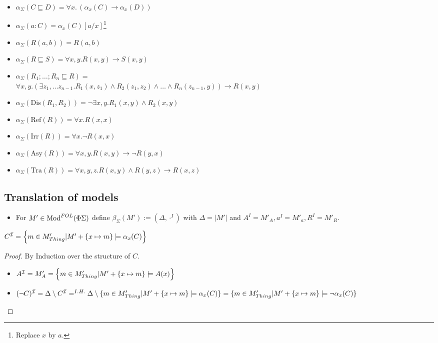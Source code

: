 \documentclass[10pt,fleqn,%
\ifpretendfinal
final%
\else
draft%
\fi,
]{scrreprt}
\newcommand{\ssclause}[1]{\subsection{#1}}
\begin{document}
\begin{itemize}
 \item $\alpha_\Sigma (C \sqsubseteq D) = \forall x.\, (\alpha_x(C) \rightarrow \alpha_x(D))$
 \item $\alpha_\Sigma (a:C) = \alpha_x(C)[a/x]$\footnote{Replace $x$ by $a$.}
 \item $\alpha_\Sigma (R(a,b)) = R(a,b)$
 \item $\alpha_\Sigma (R \sqsubseteq S) = \forall x, y. R(x,y) \rightarrow S(x,y) $
 \item $\alpha_\Sigma (R_1; \ldots; R_n \sqsubseteq R) =$\\
$ \forall x,y . (\exists z_1,\ldots z_{n-1} . R_1(x,z_1) \wedge R_2(z_1,z_2) \wedge \ldots \wedge R_n(z_{n-1},y)) \rightarrow R(x,y) $
 \item $\alpha_\Sigma (\text{Dis}(R_1,R_2)) = \neg\exists x,y . R_1(x,y)\wedge R_2(x,y)$	
 \item $\alpha_\Sigma (\text{Ref}(R)) = \forall x. R(x,x)$
 \item $\alpha_\Sigma (\text{Irr}(R)) = \forall x. \neg R(x,x)$
 \item $\alpha_\Sigma (\text{Asy}(R)) = \forall x,y . R(x,y) \rightarrow \neg R(y,x)$
 \item $\alpha_\Sigma (\text{Tra}(R)) = \forall x,y,z . R(x,y) \wedge R(y,z) \rightarrow R(x,z)$
\end{itemize}





\ssclause{Translation of models}

\begin{itemize}
	\item For $M' \in \text{Mod}^{FOL}(\Phi \Sigma)$ define $\beta_\Sigma(M') := (\Delta, \cdot^I)$
	with $\Delta = |M'|$ and $A^I = M'_A, a^I = M'_a, R^I = M'_R$.
\end{itemize}

	\begin{proposition}
$C^{\mathcal{I}} = \left\{m \in M'_{{Thing} } \lvert M' + \{x \mapsto m \} \models \alpha_x (C) \right\}$
	\end{proposition}
	
	\begin{proof} By Induction over the structure of $C$.
\begin{itemize}
	\item $A^{\mathcal{I}} = M'_A = \left \{m \in M'_{{Thing} } \vert M' + \{x \mapsto m \} \models A(x)  \right\}$
	\item $(\lnot C)^{\mathcal{I}} = \Delta \setminus C^{\mathcal{I}} =^{I.H.} \Delta \setminus \{m \in M'_{Thing}  \lvert M' + \{x \mapsto m\} \models \alpha_x(C)\} = \{m \in M'_{Thing}  \vert M' + \{x \mapsto m\} \models \lnot \alpha_x(C)\}$
\end{itemize}
	\end{proof}
\end{document}
